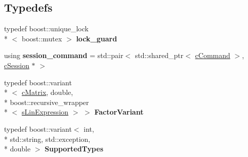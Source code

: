 \subsection*{Typedefs}
\begin{DoxyCompactItemize}
\item 
\hypertarget{namespaceengine_af1b349928e8ef52af7a7b83676140e9d}{typedef boost\-::unique\-\_\-lock\\*
$<$ boost\-::mutex $>$ {\bfseries lock\-\_\-guard}}\label{namespaceengine_af1b349928e8ef52af7a7b83676140e9d}

\item 
\hypertarget{namespaceengine_ab570e6e8084f2cbcd9026ce6db9be7ca}{using {\bfseries session\-\_\-command} = std\-::pair$<$ std\-::shared\-\_\-ptr$<$ \hyperlink{classengine_1_1cCommand}{c\-Command} $>$, \hyperlink{classengine_1_1cSession}{c\-Session} $\ast$ $>$}\label{namespaceengine_ab570e6e8084f2cbcd9026ce6db9be7ca}

\item 
\hypertarget{namespaceengine_a6596ece313a7134d3129d5385aebd33e}{typedef boost\-::variant\\*
$<$ \hyperlink{structengine_1_1cMatrix}{c\-Matrix}, double, \\*
boost\-::recursive\-\_\-wrapper\\*
$<$ \hyperlink{structengine_1_1sLinExpression}{s\-Lin\-Expression} $>$ $>$ {\bfseries Factor\-Variant}}\label{namespaceengine_a6596ece313a7134d3129d5385aebd33e}

\item 
\hypertarget{namespaceengine_a942a6c5eb4358a465a03cbf32bd4546e}{typedef boost\-::variant$<$ int, \\*
std\-::string, std\-::exception, \\*
double $>$ {\bfseries Supported\-Types}}\label{namespaceengine_a942a6c5eb4358a465a03cbf32bd4546e}

\end{DoxyCompactItemize}
